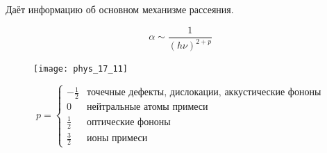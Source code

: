 Даёт информацию об основном механизме рассеяния.

$$\alpha \sim \frac{1}{(h\nu)^{2+p}}$$

\begin{figure}[h!]
    \centering
    \texttt{[image: phys\_17\_11]}
\end{figure}

$$
p=\left\{\begin{array}{cl}
-\frac{1}{2} & \text{точечные дефекты, дислокации, аккустические фононы} \\
0 & \text{нейтральные атомы примеси} \\
\frac{1}{2} & \text{оптические фононы} \\
\frac{3}{2} & \text{ионы примеси} 
\end{array}\right.
$$